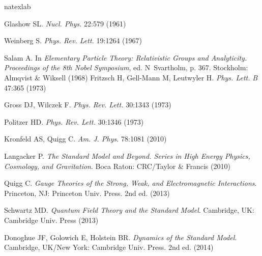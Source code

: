\documentclass[letterpaper]{ar-1col}
\begin{document}
\begin{thebibliography}{96}
\expandafter\ifx\csname
natexlab\endcsname\relax\def\natexlab#1{#1}\fi

Glashow SL. \textit{Nucl. Phys.} 22:579 (1961)

Weinberg S. \textit{Phys. Rev. Lett.} 19:1264 (1967)

Salam A.  In \textit{Elementary Particle Theory: Relativistic
Groups and Analyticity. Proceedings of the 8th Nobel Symposium},
ed. N~Svartholm, p. 367. Stockholm: Almqvist \& Wiksell
 (1968)
Fritzsch H, Gell-Mann M, Leutwyler H. \textit{Phys. Lett.} \textit{B} 47:365
(1973)

Gross DJ, Wilczek F. \textit{Phys. Rev. Lett.} 30:1343 (1973)

Politzer HD. \textit{Phys. Rev. Lett.} 30:1346 (1973)

Kronfeld AS, Quigg C. \textit{Am. J. Phys.} 78:1081 (2010)

Langacker P. \textit{The Standard Model and Beyond. Series in
High Energy Physics, Cosmology, and Gravitation}. Boca Raton:
CRC/Taylor \& Francis (2010)

Quigg C. \textit{Gauge Theories of the Strong, Weak, and
Electromagnetic Interactions}. Princeton, NJ: Princeton
Univ. Press. 2nd ed. (2013)

Schwartz MD. \textit{Quantum Field Theory and the Standard Model}.
Cambridge, UK: Cambridge Univ. Press (2013)

Donoghue JF, Golowich E, Holstein BR. \textit{Dynamics of the
Standard Model}. Cambridge, UK/New York: Cambridge
Univ. Press. 2nd ed. (2014)

\end{thebibliography}



 

\end{document}
